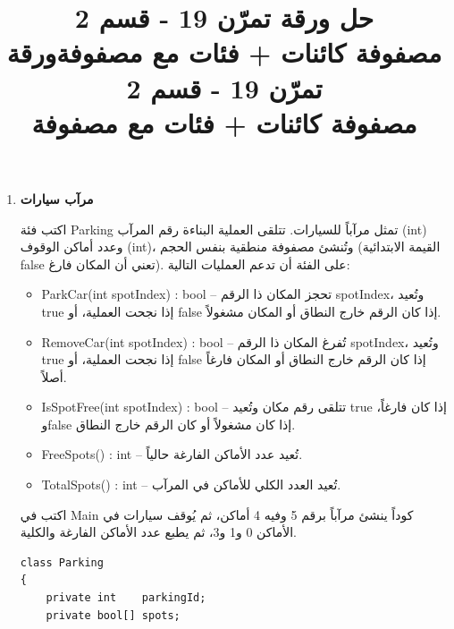 \documentclass[14pt]{extarticle}
\title{حل ورقة تمرّن 19 - قسم 2 \\ مصفوفة كائنات + فئات مع مصفوفة}
\title{ورقة تمرّن 19 - قسم 2 \\ مصفوفة كائنات + فئات مع مصفوفة}
\begin{document}
\maketitle
\thispagestyle{fancy}

\begin{enumerate}

\item \textbf{مرآب سيارات}

اكتب فئة \textenglish{Parking} تمثل مرآباً للسيارات.
تتلقى العملية البناءة رقم المرآب (\textenglish{int}) وعدد أماكن الوقوف (\textenglish{int})،
وتُنشئ مصفوفة منطقية بنفس الحجم (القيمة الابتدائية \textenglish{false} تعني أن المكان فارغ).
على الفئة أن تدعم العمليات التالية:

\begin{itemize}
  \item \textenglish{ParkCar(int spotIndex) : bool} --
        تحجز المكان ذا الرقم \textenglish{spotIndex}،
        وتُعيد \textenglish{true} إذا نجحت العملية،
        أو \textenglish{false} إذا كان الرقم خارج النطاق أو المكان مشغولاً.

  \item \textenglish{RemoveCar(int spotIndex) : bool} --
        تُفرغ المكان ذا الرقم \textenglish{spotIndex}،
        وتُعيد \textenglish{true} إذا نجحت العملية،
        أو \textenglish{false} إذا كان الرقم خارج النطاق أو المكان فارغاً أصلاً.

  \item \textenglish{IsSpotFree(int spotIndex) : bool} --
        تتلقى رقم مكان وتُعيد \textenglish{true} إذا كان فارغاً،
        و\textenglish{false} إذا كان مشغولاً أو كان الرقم خارج النطاق.

  \item \textenglish{FreeSpots() : int} --
        تُعيد عدد الأماكن الفارغة حالياً.

  \item \textenglish{TotalSpots() : int} --
        تُعيد العدد الكلي للأماكن في المرآب.
\end{itemize}

اكتب في \textenglish{Main} كوداً ينشئ مرآباً برقم 5 وفيه 4 أماكن،
ثم يُوقف سيارات في الأماكن 0 و1 و3،
ثم يطبع عدد الأماكن الفارغة والكلية.

\ifwithsols
{\small
\begin{boxSolution}
\begin{english}
\begin{verbatim}
class Parking
{
    private int    parkingId;
    private bool[] spots;


\end{verbatim}
\end{english}
\end{boxSolution}}
\end{enumerate}
\end{document}
